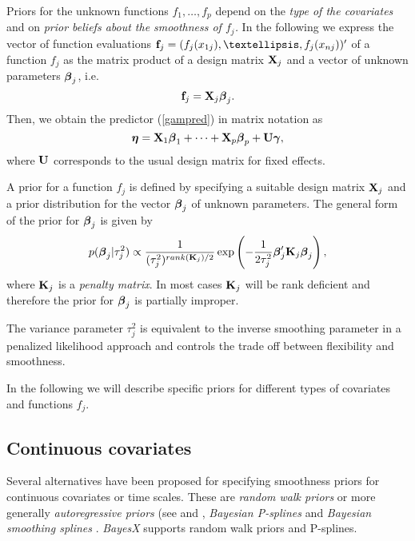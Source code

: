 \documentclass[11pt,a4paper,twoside]{bayesxarticle}
\begin{document}
Priors for the unknown functions $f_{1},\dots,f_{p}$ depend on the
{\em type of the covariates} and on {\em prior beliefs about the
smoothness of $f_j$.} In the following we express the vector of
function evaluations $\fvec_j=(f_j(x_{1j}),\dots,f_j(x_{nj}))'$ of a
function $f_j$ as the matrix product of a design matrix $\mathbf{X}_j$ and a
vector of unknown parameters $\boldsymbol{\beta}_j$, i.e.
\begin{equation}
\label{matproduct} \fvec_j=\Xvec_j \betavec_j.
\end{equation}
Then, we obtain the predictor (\ref{gampred}) in matrix notation
as
\begin{equation}
\label{gampredmatrix} \etavec = \Xvec_1 \betavec_1 + \cdots + \Xvec_p \betavec_p +
\Uvec \gammavec,
\end{equation}
where $\mathbf{U}$ corresponds to the usual design matrix for fixed
effects.

A prior for a function $f_j$ is defined by specifying a suitable
design matrix $\mathbf{X}_j$ and a prior distribution for the vector
$\boldsymbol{\beta}_j$ of unknown parameters. The general form of the prior for
$\boldsymbol{\beta}_j$ is given by
\begin{equation}
\label{genform} p(\betavec_j | \tau_j^2) \propto
\frac{1}{(\tau^2_j)^{rank(\Kvec_j)/2}} \exp\left(-\frac{1}{2\tau_j^2}
\betavec_j' \Kvec_j \betavec_j\right),
\end{equation}
where $\mathbf{K}_j$ is a {\em penalty matrix}. In most cases $\mathbf{K}_j$ will be
rank deficient and therefore the prior for $\boldsymbol{\beta}_j$ is partially improper.

The variance parameter $\tau_j^2$ is  equivalent to the inverse
smoothing parameter in a penalized likelihood approach and controls the
trade off between flexibility and smoothness.

In the following we will describe specific priors for different
types of covariates and functions $f_j$.


\subsection{Continuous covariates}
\label{psplines}

Several alternatives have been  proposed for specifying smoothness priors for continuous covariates or time scales. These are
{\em random walk priors} or more generally {\em autoregressive priors} (see  and ,
{\em Bayesian P-splines} \cite{LanBre04} and {\em Bayesian smoothing splines} \cite{HasTib00}. {\em BayesX} supports random
walk priors and P-splines.
\end{document}
